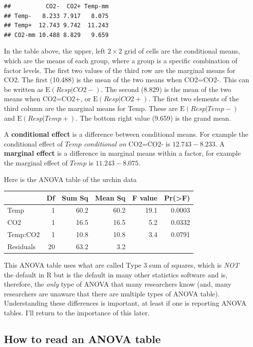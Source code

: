 \documentclass[]{book}
\begin{document}
\begin{verbatim}
##          CO2-  CO2+ Temp-mm
## Temp-   8.233 7.917   8.075
## Temp+  12.743 9.742  11.243
## CO2-mm 10.488 8.829   9.659
\end{verbatim}

In the table above, the upper, left \(2 \times 2\) grid of cells are the
conditional means, which are the means of each group, where a group is a
specific combination of factor levels. The first two values of the third
row are the marginal means for CO2. The first (10.488) is the mean of
the two means when CO2=CO2-. This can be written as
\(\mathrm{E}(Resp|CO2-)\). The second (8.829) is the mean of the two
means when CO2=CO2+, or \(\mathrm{E}(Resp|CO2+)\). The first two
elements of the third column are the marginal means for Temp. These are
\(\mathrm{E}(Resp|Temp-)\) and \(\mathrm{E}(Resp|Temp+)\). The bottom
right value (9.659) is the grand mean.

A \textbf{conditional effect} is a difference between conditional means.
For example the conditional effect of \(Temp\) \emph{conditional on}
CO2=CO2- is \(12.743-8.233\). A \textbf{marginal effect} is a difference
in marginal means within a factor, for example the marginal effect of
\(Temp\) is \(11.243 - 8.075\).

Here is the ANOVA table of the urchin data

\begin{tabular}{l|r|r|r|r|r}
\hline
  & Df & Sum Sq & Mean Sq & F value & Pr(>F)\\
\hline
Temp & 1 & 60.2 & 60.2 & 19.1 & 0.0003\\
\hline
CO2 & 1 & 16.5 & 16.5 & 5.2 & 0.0332\\
\hline
Temp:CO2 & 1 & 10.8 & 10.8 & 3.4 & 0.0791\\
\hline
Residuals & 20 & 63.2 & 3.2 &  & \\
\hline
\end{tabular}

This ANOVA table uses what are called Type 3 sum of squares, which is
\emph{NOT} the default in R but is the default in many other statistics
software and is, therefore, the \emph{only} type of ANOVA that many
researchers know (and, many researchers are unaware that there are
multiple types of ANOVA table). Understanding these differences is
important, at least if one is reporting ANOVA tables. I'll return to the
importance of this later.

\subsection{How to read an ANOVA
table}\label{how-to-read-an-anova-table}
\end{document}
